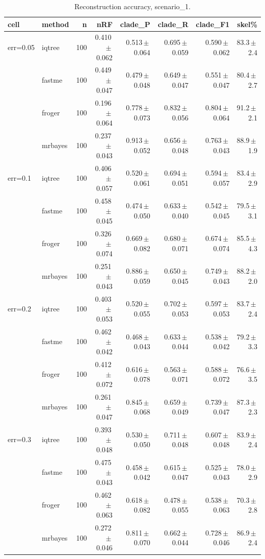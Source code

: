 \begin{table}[t]
\centering
\caption{Reconstruction accuracy, scenario\_1.}
\label{tab:scenario1}
\begin{tabular}{ll r rrrrr}
\toprule
cell & method & n & nRF & clade\_P & clade\_R & clade\_F1 & skel\% \\
\midrule
err=0.05 & iqtree & 100 & 0.410\,$\pm$\,0.062 & 0.513\,$\pm$\,0.064 & 0.695\,$\pm$\,0.059 & 0.590\,$\pm$\,0.062 & 83.3\,$\pm$\,2.4 \\
 & fastme & 100 & 0.449\,$\pm$\,0.047 & 0.479\,$\pm$\,0.048 & 0.649\,$\pm$\,0.047 & 0.551\,$\pm$\,0.047 & 80.4\,$\pm$\,2.7 \\
 & froger & 100 & 0.196\,$\pm$\,0.064 & 0.778\,$\pm$\,0.073 & 0.832\,$\pm$\,0.056 & 0.804\,$\pm$\,0.064 & 91.2\,$\pm$\,2.1 \\
 & mrbayes & 100 & 0.237\,$\pm$\,0.043 & 0.913\,$\pm$\,0.052 & 0.656\,$\pm$\,0.048 & 0.763\,$\pm$\,0.043 & 88.9\,$\pm$\,1.9 \\
err=0.1 & iqtree & 100 & 0.406\,$\pm$\,0.057 & 0.520\,$\pm$\,0.061 & 0.694\,$\pm$\,0.051 & 0.594\,$\pm$\,0.057 & 83.4\,$\pm$\,2.9 \\
 & fastme & 100 & 0.458\,$\pm$\,0.045 & 0.474\,$\pm$\,0.050 & 0.633\,$\pm$\,0.040 & 0.542\,$\pm$\,0.045 & 79.5\,$\pm$\,3.1 \\
 & froger & 100 & 0.326\,$\pm$\,0.074 & 0.669\,$\pm$\,0.082 & 0.680\,$\pm$\,0.071 & 0.674\,$\pm$\,0.074 & 85.5\,$\pm$\,4.3 \\
 & mrbayes & 100 & 0.251\,$\pm$\,0.043 & 0.886\,$\pm$\,0.059 & 0.650\,$\pm$\,0.045 & 0.749\,$\pm$\,0.043 & 88.2\,$\pm$\,2.0 \\
err=0.2 & iqtree & 100 & 0.403\,$\pm$\,0.053 & 0.520\,$\pm$\,0.055 & 0.702\,$\pm$\,0.053 & 0.597\,$\pm$\,0.053 & 83.7\,$\pm$\,2.4 \\
 & fastme & 100 & 0.462\,$\pm$\,0.042 & 0.468\,$\pm$\,0.043 & 0.633\,$\pm$\,0.044 & 0.538\,$\pm$\,0.042 & 79.2\,$\pm$\,3.3 \\
 & froger & 100 & 0.412\,$\pm$\,0.072 & 0.616\,$\pm$\,0.078 & 0.563\,$\pm$\,0.071 & 0.588\,$\pm$\,0.072 & 76.6\,$\pm$\,3.5 \\
 & mrbayes & 100 & 0.261\,$\pm$\,0.047 & 0.845\,$\pm$\,0.068 & 0.659\,$\pm$\,0.049 & 0.739\,$\pm$\,0.047 & 87.3\,$\pm$\,2.3 \\
err=0.3 & iqtree & 100 & 0.393\,$\pm$\,0.048 & 0.530\,$\pm$\,0.050 & 0.711\,$\pm$\,0.048 & 0.607\,$\pm$\,0.048 & 83.9\,$\pm$\,2.4 \\
 & fastme & 100 & 0.475\,$\pm$\,0.043 & 0.458\,$\pm$\,0.042 & 0.615\,$\pm$\,0.047 & 0.525\,$\pm$\,0.043 & 78.0\,$\pm$\,2.9 \\
 & froger & 100 & 0.462\,$\pm$\,0.063 & 0.618\,$\pm$\,0.082 & 0.478\,$\pm$\,0.055 & 0.538\,$\pm$\,0.063 & 70.3\,$\pm$\,2.8 \\
 & mrbayes & 100 & 0.272\,$\pm$\,0.046 & 0.811\,$\pm$\,0.070 & 0.662\,$\pm$\,0.044 & 0.728\,$\pm$\,0.046 & 86.9\,$\pm$\,2.4 \\
\bottomrule
\end{tabular}
\end{table}